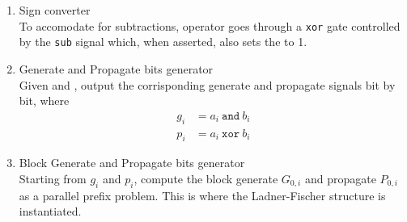\begin{enumerate}
    \item Sign converter \\
    To accomodate for subtractions, operator  goes through a \texttt{xor} gate controlled by the
    \texttt{sub} signal which, when asserted, also sets the  to 1.

    \item Generate and Propagate bits generator \\
    Given  and , output the corrisponding generate and propagate signals bit by bit, where
    \begin{align*}
        g_i &= a_i\ \texttt{and}\ b_i \\
        p_i &= a_i\ \texttt{xor}\ b_i
    \end{align*}

    \item Block Generate and Propagate bits generator \\
    Starting from $g_i$ and $p_i$, compute the block generate $G_{0, i}$ and propagate $P_{0, i}$ as a parallel prefix
    problem. This is where the Ladner-Fischer structure is instantiated.


\end{enumerate}
